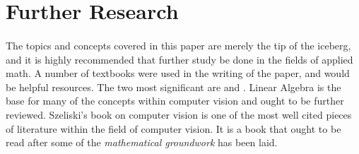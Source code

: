 \documentclass[11pt]{article}
\newcommand\simpleparagraph[1]{%
	\stepcounter{paragraph}\paragraph*{\theparagraph\quad{}#1}}
\renewcommand\theparagraph{}
\begin{document}
\section{Further Research}
\simpleparagraph{}
The topics and concepts covered in this paper are merely the tip of the iceberg, and it is highly recommended that further study be done in the fields of applied math. A number of textbooks were used in the writing of the paper, and would be helpful resources. The two most significant are \cite[Computer Vision: Algorithms and Application][]{szeliski_computer_2011} and \cite[Elementary Linear Algebra with Applications][]{kolman_elementary_2008}. Linear Algebra is the base for many of the concepts within computer vision and ought to be further reviewed. Szeliski's book on computer vision is one of the most well cited pieces of literature within the field of computer vision. It is a book that ought to be read after some of the \textit{mathematical groundwork} has been laid.

\nocite{*}
\newpage
\singlespacing

{} 

\end{document}
